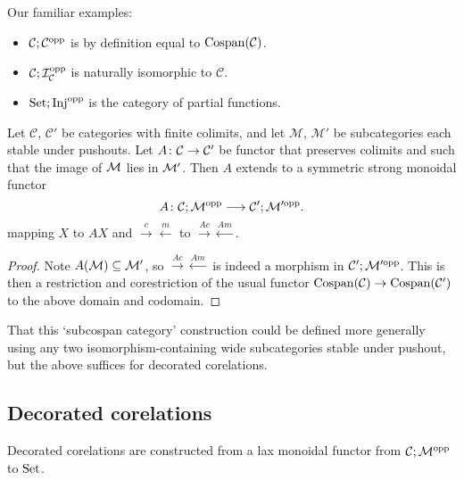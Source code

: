 \begin{examples} 
  Our familiar examples:
  \begin{itemize}
    \item $\mathcal C; \mathcal C^{\mathrm{opp}}$ is by definition equal to
$\operatorname{{Cospan}}(\mathcal C)$.
\item $\mathcal C;\mathcal I_{\mathcal C}^{\mathrm{opp}}$ is
naturally isomorphic to $\mathcal C$.
\item $\mathrm{Set};\mathrm{Inj}^{\mathrm{opp}}$ is the category of partial functions.
\end{itemize}
\end{examples}

\begin{lemma} \label{lem.madjointsfunctor}
  Let $\mathcal C$, $\mathcal C'$ be categories with finite colimits, and let
  $\mathcal M$, $\mathcal M'$ be subcategories each stable under pushouts. Let
  $A{\colon} \mathcal C \to \mathcal C'$ be functor that preserves colimits and such
  that the image of $\mathcal M$ lies in $\mathcal M'$. Then $A$ extends to a symmetric
  strong monoidal functor
  \[
    A{\colon} \mathcal C;\mathcal M^{\mathrm{opp}} \longrightarrow \mathcal C'; \mathcal M'^{\mathrm{opp}}.
  \]
  mapping $X$ to $AX$ and $\stackrel{c}\rightarrow \stackrel{m}\leftarrow$ to
  $\stackrel{Ac}\rightarrow \stackrel{Am}\leftarrow$.
\end{lemma}
\begin{proof}
  Note $A(\mathcal M) \subseteq \mathcal M'$, so $\stackrel{Ac}\rightarrow
  \stackrel{Am}\leftarrow$ is indeed a morphism in $\mathcal C';\mathcal M'^{\mathrm{opp}}$. This is
  then a restriction and corestriction of the usual functor $\operatorname{{Cospan}}(\mathcal C) \to
  \operatorname{{Cospan}}(\mathcal C')$ to the above domain and codomain.
\end{proof}

That this `subcospan category' construction could be defined more
generally using any two isomorphism-containing wide subcategories stable under
pushout, but the above suffices for decorated corelations. 

\subsection{Decorated corelations}
Decorated corelations are constructed from a lax monoidal functor from $\mathcal
C;\mathcal M^{\mathrm{opp}}$ to $\mathrm{Set}$.

